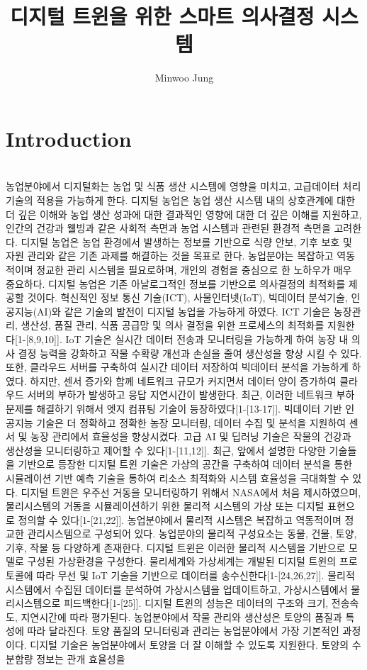 \documentclass[11pt]{article}
\title{디지털 트윈을 위한 스마트 의사결정 시스템}
\author{Minwoo Jung}
\begin{document}
\maketitle

\section{Introduction}

\indent \\농업분야에서 디지털화는 농업 및 식품 생산 시스템에 영향을 미치고, 고급데이터 처리 기술의 적용을 가능하게 한다. 디지털 농업은 농업 생산 시스템 내의 상호관계에 대한 더 깊은 이해와 농업 생산 성과에 대한 결과적인 영향에 대한 더 깊은 이해를 지원하고, 인간의 건강과 웰빙과 같은 사회적 측면과 농업 시스템과 관련된 환경적 측면을 고려한다. 디지털 농업은 농업 환경에서 발생하는 정보를 기반으로 식량 안보, 기후 보호 및 자원 관리와 같은 기존 과제를 해결하는 것을 목표로 한다. 농업분야는 복잡하고 역동적이며 정교한 관리 시스템을 필요로하며, 개인의 경험을 중심으로 한 노하우가 매우 중요하다. 디지털 농업은 기존 아날로그적인 정보를 기반으로 의사결정의 최적화를 제공할 것이다. 혁신적인 정보 통신 기술(ICT), 사물인터넷(IoT), 빅데이터 분석기술, 인공지능(AI)와 같은 기술의 발전이 디지털 농업을 가능하게 하였다. ICT 기술은 농장관리, 생산성, 품질 관리, 식품 공급망 및 의사 결정을 위한 프로세스의 최적화를 지원한다[1-[8,9,10]]. IoT 기술은 실시간 데이터 전송과 모니터링을 가능하게 하여 농장 내 의사 결정 능력을 강화하고 작물 수확량 개선과 손실을 줄여 생산성을 향상 시킬 수 있다. 또한, 클라우드 서버를 구축하여 실시간 데이터 저장하여 빅데이터 분석을 가능하게 하였다. 하지만, 센서 증가와 함께 네트워크 규모가 커지면서 데이터 양이 증가하여 클라우드 서버의 부하가 발생하고 응답 지연시간이 발생한다. 최근, 이러한 네트워크 부하문제를 해결하기 위해서 엣지 컴퓨팅 기술이 등장하였다[1-[13-17]]. 빅데이터 기반 인공지능 기술은 더 정확하고 정확한 농장 모니터링, 데이터 수집 및 분석을 지원하여 센서 및 농장 관리에서 효율성을 향상시켰다. 고급 AI 및 딥러닝 기술은 작물의 건강과 생산성을 모니터링하고 제어할 수 있다[1-[11,12]]. 최근, 앞에서 설명한 다양한 기술들을 기반으로 등장한 디지털 트윈 기술은 가상의 공간을 구축하여 데이터 분석을 통한 시뮬레이션 기반 예측 기술을 통하여 리소스 최적화와 시스템 효율성을 극대화할 수 있다. 디지털 트윈은 우주선 거동을 모니터링하기 위해서 NASA에서 처음 제시하였으며, 물리시스템의 거동을 시뮬레이션하기 위한 물리적 시스템의 가상 또는 디지털 표현으로 정의할 수 있다[1-[21,22]]. 농업분야에서 물리적 시스템은 복잡하고 역동적이며 정교한 관리시스템으로 구성되어 있다. 농업분야의 물리적 구성요소는 동물, 건물, 토양, 기후, 작물 등 다양하게 존재한다. 디지털 트윈은 이러한 물리적 시스템을 기반으로 모델로 구성된 가상환경을 구성한다. 물리세계와 가상세계는 개발된 디지털 트윈의 프로토콜에 따라 무선 및 IoT 기술을 기반으로 데이터를 송수신한다[1-[24,26,27]]. 물리적 시스템에서 수집된 데이터를 분석하여 가상시스템을 업데이트하고, 가상시스템에서 물리시스템으로 피드백한다[1-[25]]. 디지털 트윈의 성능은 데이터의 구조와 크기, 전송속도, 지연시간에 따라 평가된다. 농업분야에서 작물 관리와 생산성은 토양의 품질과 특성에 따라 달라진다. 토양 품질의 모니터링과 관리는 농업분야에서 가장 기본적인 과정이다. 디지털 기술은 농업분야에서 토양을 더 잘 이해할 수 있도록 지원한다. 토양의 수분함량 정보는 관개 효율성을 
\end{document}
